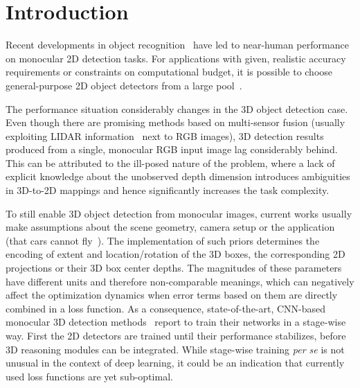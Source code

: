 \documentclass[10pt,twocolumn,letterpaper]{article}
\begin{document}
\section{Introduction}
Recent developments in object recognition~\cite{Liu_2018_DetSurvey} have led to near-human performance on monocular 2D detection tasks. For applications with given, realistic accuracy requirements or constraints on computational budget, it is possible to choose general-purpose 2D object detectors from a large pool~\cite{Ren+15,Liu2016,Redmon2016,Wu_2017_CVPR_Workshops,Redmon_2017_CVPR,Lin+17,Law_2018_ECCV}. 

The performance situation considerably changes in the 3D object detection case. Even though there are promising methods based on multi-sensor fusion (usually exploiting LIDAR information~\cite{Liang_CVPR_2019,Wang_arxiv_2019,Shin_arxiv_18,shi2018pointrcnn} next to RGB images), 3D detection results produced from a single, monocular RGB input image lag considerably behind. This can be attributed to the ill-posed nature of the problem, where a lack of explicit knowledge about the unobserved depth dimension introduces ambiguities in 3D-to-2D mappings and hence significantly increases the task complexity. 

To still enable 3D object detection from monocular images, current works usually make assumptions about the scene geometry, camera setup or the application (\eg that cars cannot fly~\cite{qin2019monogrnet}). The implementation of such priors determines the encoding of extent and location/rotation of the 3D boxes, the corresponding 2D projections or their 3D box center depths. The magnitudes of these parameters have different units and therefore non-comparable meanings, which can negatively affect the optimization dynamics when error terms based on them are directly combined in a loss function. As a consequence, state-of-the-art, CNN-based monocular 3D detection methods~\cite{Manhardt_2019_CVPR,qin2019monogrnet} report to train their networks in a stage-wise way. First the 2D detectors are trained until their performance stabilizes, before 3D reasoning modules can be integrated. While stage-wise training \textit{per se} is not unusual in the context of deep learning, it could be an indication that currently used loss functions are yet sub-optimal. 
\end{document}
